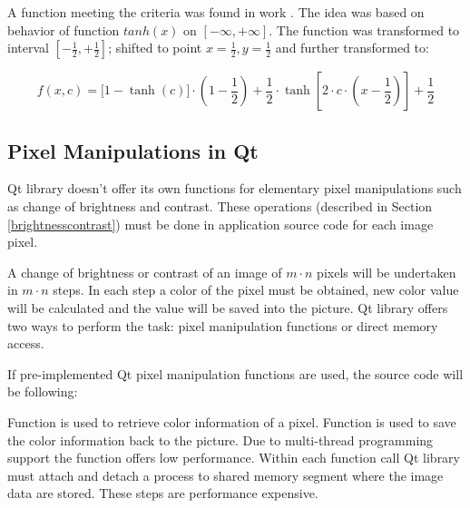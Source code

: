 A function meeting the criteria was found in work \cite[page~18]{flaska_vu}. The idea was based on behavior of function $tanh(x)$ on $[-\infty,+\infty]$. The function was transformed to interval $[-\frac{1}{2},+\frac{1}{2}]$; shifted to point $x=\frac{1}{2}, y=\frac{1}{2}$ and further transformed to:

 \[ f(x,c)= \bigg[ 1-\tanh(c) \bigg] \cdot \left(1-\frac{1}{2}\right) + \frac{1}{2} \cdot \tanh\left[ 2 \cdot c \cdot \left(x - \frac{1}{2}\right) \right] + \frac{1}{2} \]

\subsection{Pixel Manipulations in Qt}

Qt library doesn't offer its own functions for elementary pixel manipulations such as change of brightness and contrast. These operations (described in Section \ref{brightnesscontrast}) must be done in application source code for each image pixel.

A change of brightness or contrast of an image of $m \cdot n$ pixels will be undertaken in $m \cdot n$ steps. In each step a color of the pixel must be obtained, new color value will be calculated and the value will be saved into the picture. Qt library offers two ways to perform the task: pixel manipulation functions or direct memory access.

If pre-implemented Qt pixel manipulation functions are used, the source code will be following:

Function  is used to retrieve color information of a pixel. Function  is used to save the color information back to the picture. Due to multi-thread programming support the  function offers low performance. Within each function call Qt library must attach and detach a process to shared memory segment where the image data are stored. These steps are performance expensive.

